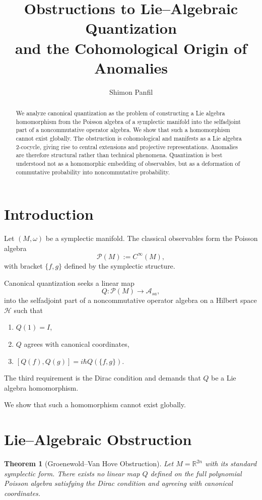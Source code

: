 \documentclass[11pt]{article}
\title{Obstructions to Lie--Algebraic Quantization\\
and the Cohomological Origin of Anomalies}
\author{Shimon Panfil}
\date{}
\newtheorem{theorem}{Theorem}
\theoremstyle{definition}
\theoremstyle{remark}
\begin{document}
\maketitle

\begin{abstract}
We analyze canonical quantization as the problem of constructing a Lie algebra homomorphism from the Poisson algebra of a symplectic manifold into the selfadjoint part of a noncommutative operator algebra. We show that such a homomorphism cannot exist globally. The obstruction is cohomological and manifests as a Lie algebra 2-cocycle, giving rise to central extensions and projective representations. Anomalies are therefore structural rather than technical phenomena. Quantization is best understood not as a homomorphic embedding of observables, but as a deformation of commutative probability into noncommutative probability.
\end{abstract}

\section{Introduction}

Let $(M,\omega)$ be a symplectic manifold. The classical observables form the Poisson algebra
\[
\mathcal{P}(M) := C^\infty(M),
\]
with bracket $\{f,g\}$ defined by the symplectic structure.

Canonical quantization seeks a linear map
\[
Q: \mathcal{P}(M) \to \mathcal{A}_{sa},
\]
into the selfadjoint part of a noncommutative operator algebra on a Hilbert space $\mathcal{H}$ such that
\begin{enumerate}[label=(\arabic*)]
\item $Q(1)=I$,
\item $Q$ agrees with canonical coordinates,
\item $[Q(f),Q(g)] = i\hbar Q(\{f,g\})$.
\end{enumerate}

The third requirement is the Dirac condition and demands that $Q$ be a Lie algebra homomorphism.

We show that such a homomorphism cannot exist globally.

\section{Lie--Algebraic Obstruction}

\begin{theorem}[Groenewold--Van Hove Obstruction]
Let $M=\mathbb{R}^{2n}$ with its standard symplectic form. There exists no linear map $Q$ defined on the full polynomial Poisson algebra satisfying the Dirac condition and agreeing with canonical coordinates.
\end{theorem}
\end{document}
